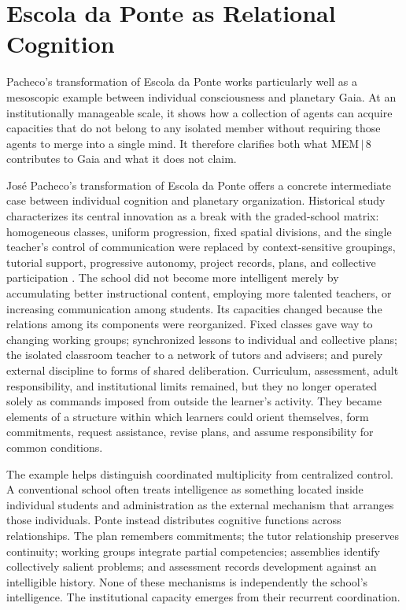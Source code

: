 \documentclass[11pt]{article}
\begin{document}
\section{Escola da Ponte as Relational Cognition}
\label{sec:ponte}

Pacheco's transformation of Escola da Ponte works particularly well as a mesoscopic example between individual consciousness and planetary Gaia. At an institutionally manageable scale, it shows how a collection of agents can acquire capacities that do not belong to any isolated member without requiring those agents to merge into a single mind. It therefore clarifies both what MEM\,$|$\,8 contributes to Gaia and what it does not claim.

José Pacheco's transformation of Escola da Ponte offers a concrete intermediate case between individual cognition and planetary organization. Historical study characterizes its central innovation as a break with the graded-school matrix: homogeneous classes, uniform progression, fixed spatial divisions, and the single teacher's control of communication were replaced by context-sensitive groupings, tutorial support, progressive autonomy, project records, plans, and collective participation \cite{silva2020}. The school did not become more intelligent merely by accumulating better instructional content, employing more talented teachers, or increasing communication among students. Its capacities changed because the relations among its components were reorganized. Fixed classes gave way to changing working groups; synchronized lessons to individual and collective plans; the isolated classroom teacher to a network of tutors and advisers; and purely external discipline to forms of shared deliberation. Curriculum, assessment, adult responsibility, and institutional limits remained, but they no longer operated solely as commands imposed from outside the learner's activity. They became elements of a structure within which learners could orient themselves, form commitments, request assistance, revise plans, and assume responsibility for common conditions.

The example helps distinguish coordinated multiplicity from centralized control. A conventional school often treats intelligence as something located inside individual students and administration as the external mechanism that arranges those individuals. Ponte instead distributes cognitive functions across relationships. The plan remembers commitments; the tutor relationship preserves continuity; working groups integrate partial competencies; assemblies identify collectively salient problems; and assessment records development against an intelligible history. None of these mechanisms is independently the school's intelligence. The institutional capacity emerges from their recurrent coordination.
\end{document}
